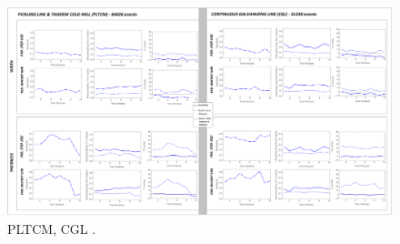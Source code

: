\begin{landscape}
\begin{figure}[ht]
	\centering
	\hspace*{-1.3cm}
	\captionsetup{width=2\linewidth}
	\includegraphics[width=1.6\textwidth]{../images/supplements-PLTCM_CGL_real_life_events_analysis-results-curves_and_discrete_time.png}
	\caption{PLTCM, CGL \cc{} \ee{}.}
	\label{figure-supplements-PLTCM_CGL-curveplots_discrete}
\end{figure}
\end{landscape}
